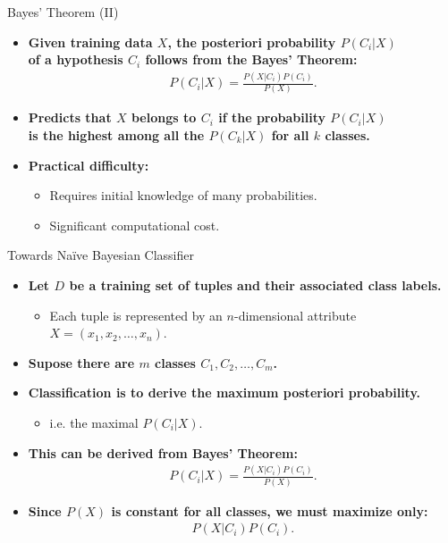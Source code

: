 \begin{frame}{Bayes' Theorem (II)}
	\begin{itemize}
		\item \textbf{Given training data $X$, the posteriori probability $P(C_i|X)$\\
			      of a hypothesis $C_i$ follows from the Bayes' Theorem:}
		      \begin{align}
			      P(C_i|X) = \frac{P(X|C_i)P(C_i)}{P(X)}.
		      \end{align}
		\item \textbf{Predicts that $X$ belongs to $C_i$ if the probability $P(C_i|X)$\\
			      is {\color{airforceblue}the highest} among all the $P(C_k|X)$ for all $k$ classes.}
		\item \textbf{Practical difficulty:}
		      \begin{itemize}
			      \item Requires initial knowledge of many probabilities.
			      \item Significant computational cost.
		      \end{itemize}
	\end{itemize}
\end{frame}

\begin{frame}{Towards Naïve Bayesian Classifier}
	\begin{itemize}
		\item \textbf{Let $D$ be a training set of tuples and their associated class labels.}
		      \begin{itemize}
			      \item Each tuple is represented by an $n$-dimensional attribute $X = (x_1,x_2,\ldots,x_n)$.
		      \end{itemize}
		\item \textbf{Supose there are $m$ classes $C_1,C_2, \ldots, C_m$.}
		\item \textbf{Classification is to derive the {\color{airforceblue}maximum posteriori probability}.}
		      \begin{itemize}
			      \item i.e. the maximal $P(C_i|X)$.
		      \end{itemize}
		\item \textbf{This can be derived from Bayes' Theorem:}
		      \begin{align}
			      P(C_i|X) = \frac{P(X|C_i)P(C_i)}{P(X)}.
		      \end{align}
		\item \textbf{Since $P(X)$ is constant for all classes, we must maximize only:}
		      \begin{align}
			      P(X|C_i)P(C_i).
		      \end{align}
	\end{itemize}
\end{frame}

